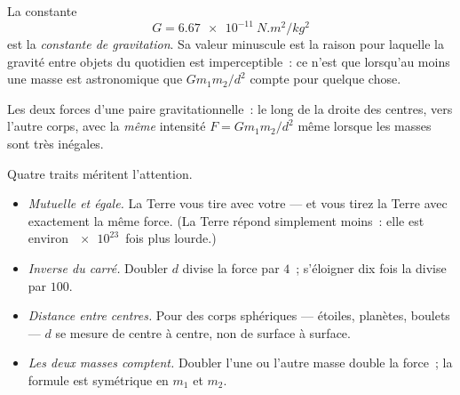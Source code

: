 \begin{definition}\label{def:g10:universal-gravitation:constant}
La constante
\[
G = \qty{6.67e-11}{N.m^2/kg^2}
\]
est la \emph{constante de gravitation}.
Sa valeur minuscule est la raison pour laquelle la gravité entre
objets du quotidien est imperceptible~: ce n'est que lorsqu'au moins
une masse est astronomique que $G m_1 m_2 / d^2$ compte pour quelque
chose.
\end{definition}

\begin{omfigure}

{\small Les deux forces d'une paire gravitationnelle~: le long de la
droite des centres, vers l'autre corps, avec la \emph{même} intensité
$F = G m_1 m_2 / d^2$ même lorsque les masses sont très inégales.}
\end{omfigure}

\begin{remark}\label{rem:g10:universal-gravitation:reading}
Quatre traits méritent l'attention.
\begin{itemize}
  \item \emph{Mutuelle et égale.} La Terre vous tire avec votre
         --- et vous tirez la Terre avec exactement la
        même force. (La Terre répond simplement moins~: elle est environ
        $\num{e23}$~fois plus lourde.)
  \item \emph{Inverse du carré.} Doubler $d$ divise la force par $4$~;
        s'éloigner dix fois la divise par $100$.
  \item \emph{Distance entre centres.} Pour des corps sphériques ---
        étoiles, planètes, boulets --- $d$ se mesure de centre à centre,
        non de surface à surface.
  \item \emph{Les deux masses comptent.} Doubler l'une ou l'autre
        masse double la force~; la formule est symétrique en $m_1$ et
        $m_2$.
\end{itemize}
\end{remark}

